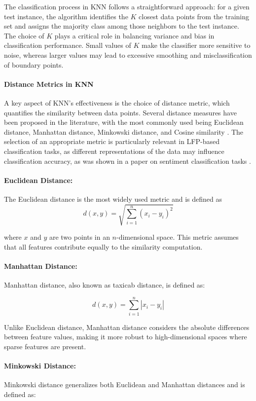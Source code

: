 \documentclass{article}
\begin{document}
The classification process in KNN follows a straightforward approach: for a given test instance, the algorithm identifies the \( K \) closest data points from the training set and assigns the majority class among those neighbors to the test instance. The choice of \( K \) plays a critical role in balancing variance and bias in classification performance. Small values of \( K \) make the classifier more sensitive to noise, whereas larger values may lead to excessive smoothing and misclassification of boundary points.

\paragraph{Distance Metrics in KNN} A key aspect of KNN's effectiveness is the choice of distance metric, which quantifies the similarity between data points. Several distance measures have been proposed in the literature, with the most commonly used being Euclidean distance, Manhattan distance, Minkowski distance, and Cosine similarity \cite{leskovec2020}. The selection of an appropriate metric is particularly relevant in LFP-based classification tasks, as different representations of the data may influence classification accuracy, as was shown in a paper on sentiment classification tasks \cite{romli2021}.

\paragraph{Euclidean Distance:}
The Euclidean distance is the most widely used metric and is defined as
\[
d(x, y) = \sqrt{\sum_{i=1}^n (x_i - y_i)^2}
\]

where \( x \) and \( y \) are two points in an \( n \)-dimensional space. This metric assumes that all features contribute equally to the similarity computation.

\paragraph{Manhattan Distance:}
Manhattan distance, also known as taxicab distance, is defined as:

\[
d(x, y) = \sum_{i=1}^n |x_i - y_i|
\]

Unlike Euclidean distance, Manhattan distance considers the absolute differences between feature values, making it more robust to high-dimensional spaces where sparse features are present.

\paragraph{Minkowski Distance:}
Minkowski distance generalizes both Euclidean and Manhattan distances and is defined as:
\end{document}
